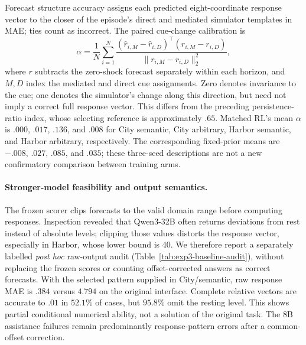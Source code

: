 Forecast structure accuracy assigns each predicted eight-coordinate response
vector to the closer of the episode's direct and mediated simulator templates
in MAE; ties count as incorrect. The paired cue-change calibration is
\[
\alpha=\frac{1}{N}\sum_{i=1}^N
\frac{(\widehat r_{i,M}-\widehat r_{i,D})^\top(r_{i,M}-r_{i,D})}
     {\lVert r_{i,M}-r_{i,D}\rVert_2^2},
\]
where $r$ subtracts the zero-shock forecast separately within each horizon,
and $M,D$ index the mediated and direct cue assignments. Zero denotes
invariance to the cue; one denotes the simulator's change along this direction,
but need not imply a correct full response vector. This differs from the
preceding persistence-ratio index, whose selecting reference is approximately
$.65$. Matched RL's mean $\alpha$ is $.000$, $.017$, $.136$, and $.008$ for
City semantic, City arbitrary, Harbor semantic, and Harbor arbitrary,
respectively. The corresponding fixed-prior means are $-.008$, $.027$,
$.085$, and $.035$; these three-seed descriptions are not a new confirmatory
comparison between training arms.

\paragraph{Stronger-model feasibility and output semantics.}
The frozen scorer clips forecasts to the valid domain range before computing
responses. Inspection revealed that Qwen3-32B often returns deviations from rest
instead of absolute levels; clipping those values distorts the response vector,
especially in Harbor, whose lower bound is 40. We therefore report a separately
labelled \emph{post hoc} raw-output audit (Table~\ref{tab:exp3-baseline-audit}),
without replacing the frozen scores or counting offset-corrected answers as
correct forecasts. With the selected pattern supplied in City/semantic, raw
response MAE is $.384$ versus $4.794$ on the original interface. Complete
relative vectors are accurate to $.01$ in $52.1\%$ of cases, but $95.8\%$ omit
the resting level. This shows partial conditional numerical ability, not a
solution of the original task. The 8B assistance failures remain predominantly
response-pattern errors after a common-offset correction.

\begin{table}[htbp]
\centering\small

\caption{\textbf{Post hoc Qwen3-32B audit of incorrectly offset answers.}
The first three numeric columns are unclipped response MAE. Exact means all
eight relative response coordinates are within $.01$ of truth; Omit rest means
both zero-shock predictions are near zero. These last two columns concern the
selected-pattern interface only. They do not measure correct absolute forecasts.}
\label{tab:exp3-baseline-audit}
\end{table}

